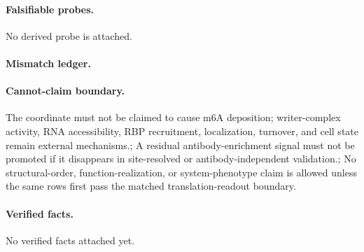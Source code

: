 \paragraph{Falsifiable probes.}
No derived probe is attached.

\paragraph{Mismatch ledger.}
\paragraph{Cannot-claim boundary.} The coordinate must not be claimed to cause m6A deposition; writer-complex activity, RNA accessibility, RBP recruitment, localization, turnover, and cell state remain external mechanisms.; A residual antibody-enrichment signal must not be promoted if it disappears in site-resolved or antibody-independent validation.; No structural-order, function-realization, or system-phenotype claim is allowed unless the same rows first pass the matched translation-readout boundary.

\paragraph{Verified facts.}
No verified facts attached yet.
